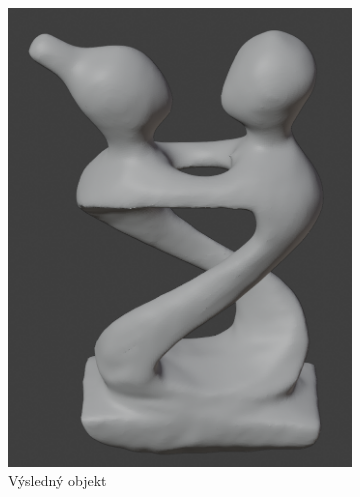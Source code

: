 \documentclass[12pt]{report}			%
\begin{document}
\begin{figure}[h]
\begin{subfigure}[b]{0.3\textwidth}
                        \includegraphics[width=\textwidth]{images/sochaObrazSedy.png}
                        \caption{Výsledný objekt}
                    \end{subfigure}
                    \hfill
                    \begin{subfigure}[b]{0.3\textwidth}
                        \centering

\end{subfigure}
\end{figure}
\end{document}
